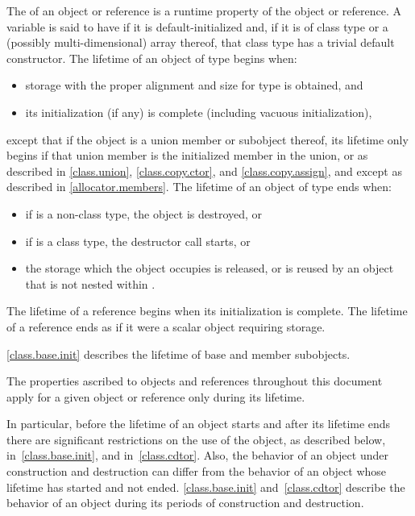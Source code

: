 \pnum
{}%
The  of an object or reference is a runtime property of the
object or reference.
A variable is said to have 
if it is default-initialized and,
if it is of class type or a (possibly multi-dimensional) array thereof,
that class type has a trivial default constructor.
The lifetime of an object of type  begins when:
\begin{itemize}
\item storage with the proper alignment and size
  for type  is obtained, and
\item its initialization (if any) is complete
  (including vacuous initialization),
\end{itemize}
except that if the object is a union member or subobject thereof,
its lifetime only begins if that union member is the
initialized member in the union,
or as described in
\ref{class.union}, \ref{class.copy.ctor}, and \ref{class.copy.assign},
and except as described in \ref{allocator.members}.
The lifetime of an object  of type  ends when:
\begin{itemize}
\item if  is a non-class type, the object is destroyed, or
\item if  is a class type, the destructor call starts, or
\item the storage which the object occupies is released,
or is reused by an object that is not nested within .
\end{itemize}

\pnum
{}%
The lifetime of a reference begins when its initialization is complete.
The lifetime of a reference ends as if it were a scalar object requiring storage.

\pnum
\begin{note}
\ref{class.base.init}
describes the lifetime of base and member subobjects.
\end{note}

\pnum
The properties ascribed to objects and references throughout this document
apply for a given object or reference only during its lifetime.
\begin{note}
In particular, before the lifetime of an object starts and after its
lifetime ends there are significant restrictions on the use of the
object, as described below, in~\ref{class.base.init}, and
in~\ref{class.cdtor}. Also, the behavior of an object under construction
and destruction can differ from the behavior of an object whose
lifetime has started and not ended. \ref{class.base.init}
and~\ref{class.cdtor} describe the behavior of an object during its periods
of construction and destruction.
\end{note}

